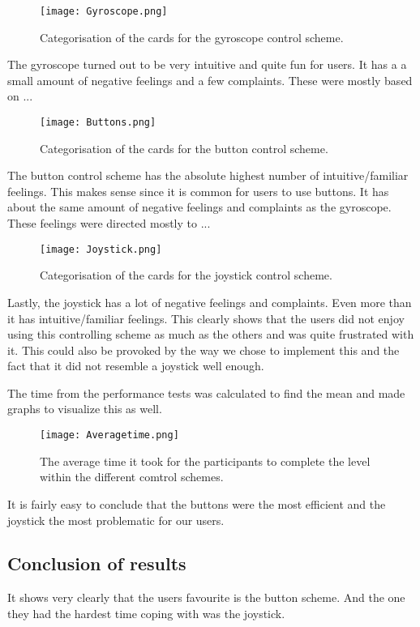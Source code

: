 \begin{figure}[H]
\centering
\texttt{[image: Gyroscope.png]}
\caption{Categorisation of the cards for the gyroscope control scheme.}
\end{figure}

The gyroscope turned out to be very intuitive and quite fun for users. It has a a small amount of negative feelings and a few complaints. These were mostly based on ... 

\begin{figure}[H]
\centering
\texttt{[image: Buttons.png]}
\caption{Categorisation of the cards for the button control scheme.}
\end{figure}

The button control scheme has the absolute highest number of intuitive/familiar feelings. This makes sense since it is common for users to use buttons. 
It has about the same amount of negative feelings and complaints as the gyroscope. These feelings were directed mostly to ... 

\begin{figure}[H]
\centering
\texttt{[image: Joystick.png]}
\caption{Categorisation of the cards for the joystick control scheme.}
\end{figure}

Lastly, the joystick has a lot of negative feelings and complaints. Even more than it has intuitive/familiar feelings. This clearly shows that the users did not enjoy using this controlling scheme as much as the others and was quite frustrated with it. This could also be provoked by the way we chose to implement this and the fact that it did not resemble a joystick well enough. 


The time from the performance tests was calculated to find the mean and made graphs to visualize this as well. 

\begin{figure}[H]
\centering
\texttt{[image: Averagetime.png]}
\caption{The average time it took for the participants to complete the level within the different comtrol schemes.}
\end{figure}

It is fairly easy to conclude that the buttons were the most efficient and the joystick the most problematic for our users. 

\subsection{Conclusion of results}

It shows very clearly that the users favourite is the button scheme. And the one they had the hardest time coping with was the joystick. 


